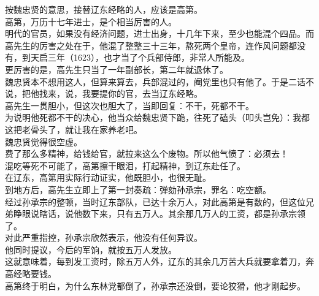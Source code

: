 \begin{multicols}{\theparacolNo}
按魏忠贤的意思，接替辽东经略的人，应该是高第。\\

高第，万历十七年进士，是个相当厉害的人。\\

明代的官员，如果没有经济问题，进士出身，十几年下来，至少也能混个四品。而高先生的厉害之处在于，他混了整整三十三年，熬死两个皇帝，连作风问题都没有，到天启三年（1623），也才当了个兵部侍郎，非常人所能及。\\

更厉害的是，高先生只当了一年副部长，第二年就退休了。\\

魏忠贤本不想用这人，但算来算去，兵部混过的，阉党里也只有他了。于是二话不说，把他找来，说，我要提你的官，去当辽东经略。\\

高先生一贯胆小，但这次也胆大了，当即回复：不干，死都不干。\\

为说明他死都不干的决心，他当众给魏忠贤下跪，往死了磕头（叩头岂免）：我都这把老骨头了，就让我在家养老吧。\\

魏忠贤觉得很空虚。\\

费了那么多精神，给钱给官，就拉来这么个废物。所以他气愤了：必须去！\\

混吃等死不可能了，高第擦干眼泪，打起精神，到辽东赴任了。\\

在辽东，高第用实际行动证实，他既胆小，也很无耻。\\

到地方后，高先生立即上了第一封奏疏：弹劾孙承宗，罪名：吃空额。\\

经过孙承宗的整顿，当时辽东部队，已达十余万人，对此高第是有数的，但这位兄弟睁眼说瞎话，说他数下来，只有五万人。其余那几万人的工资，都是孙承宗领了。\\

对此严重指控，孙承宗欣然表示，他没有任何异议。\\

他同时提议，今后的军饷，就按五万人发放。\\

这就意味着，每到发工资时，除五万人外，辽东的其余几万苦大兵就要拿着刀，奔高经略要钱。\\

高第终于明白，为什么东林党都倒了，孙承宗还没倒，要论狡猾，他才刚起步。\\


\end{multicols}
